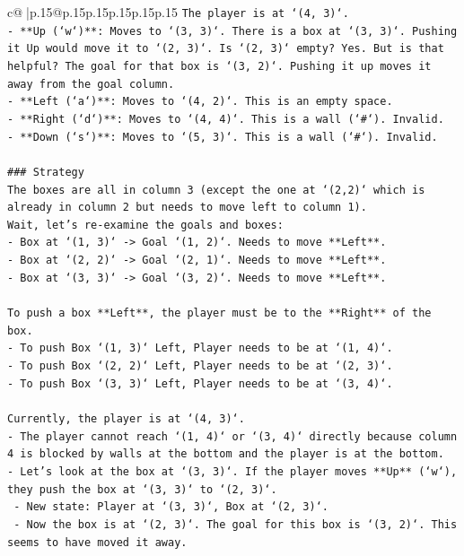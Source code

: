 \documentclass{article}
\begin{document}
{\begin{supertabular}{c@{$\;$}|p{.15\linewidth}@{}p{.15\linewidth}p{.15\linewidth}p{.15\linewidth}p{.15\linewidth}p{.15\linewidth}}
{{{\texttt{The player is at `(4, 3)`.} \\
\texttt{{-} **Up (`w`)**: Moves to `(3, 3)`. There is a box at `(3, 3)`. Pushing it Up would move it to `(2, 3)`. Is `(2, 3)` empty? Yes. But is that helpful? The goal for that box is `(3, 2)`. Pushing it up moves it away from the goal column.} \\
\texttt{{-} **Left (`a`)**: Moves to `(4, 2)`. This is an empty space.} \\
\texttt{{-} **Right (`d`)**: Moves to `(4, 4)`. This is a wall (`\#`). Invalid.} \\
\texttt{{-} **Down (`s`)**: Moves to `(5, 3)`. This is a wall (`\#`). Invalid.} \\
\\ 
\texttt{\#\#\# Strategy} \\
\texttt{The boxes are all in column 3 (except the one at `(2,2)` which is already in column 2 but needs to move left to column 1).} \\
\texttt{Wait, let's re{-}examine the goals and boxes:} \\
\texttt{{-} Box at `(1, 3)` {-}> Goal `(1, 2)`. Needs to move **Left**.} \\
\texttt{{-} Box at `(2, 2)` {-}> Goal `(2, 1)`. Needs to move **Left**.} \\
\texttt{{-} Box at `(3, 3)` {-}> Goal `(3, 2)`. Needs to move **Left**.} \\
\\ 
\texttt{To push a box **Left**, the player must be to the **Right** of the box.} \\
\texttt{{-} To push Box `(1, 3)` Left, Player needs to be at `(1, 4)`.} \\
\texttt{{-} To push Box `(2, 2)` Left, Player needs to be at `(2, 3)`.} \\
\texttt{{-} To push Box `(3, 3)` Left, Player needs to be at `(3, 4)`.} \\
\\ 
\texttt{Currently, the player is at `(4, 3)`.} \\
\texttt{{-} The player cannot reach `(1, 4)` or `(3, 4)` directly because column 4 is blocked by walls at the bottom and the player is at the bottom.} \\
\texttt{{-} Let's look at the box at `(3, 3)`. If the player moves **Up** (`w`), they push the box at `(3, 3)` to `(2, 3)`.} \\
\texttt{  {-} New state: Player at `(3, 3)`, Box at `(2, 3)`.} \\
\texttt{  {-} Now the box is at `(2, 3)`. The goal for this box is `(3, 2)`. This seems to have moved it away.} \\
}}}
\end{supertabular}}
\end{document}

